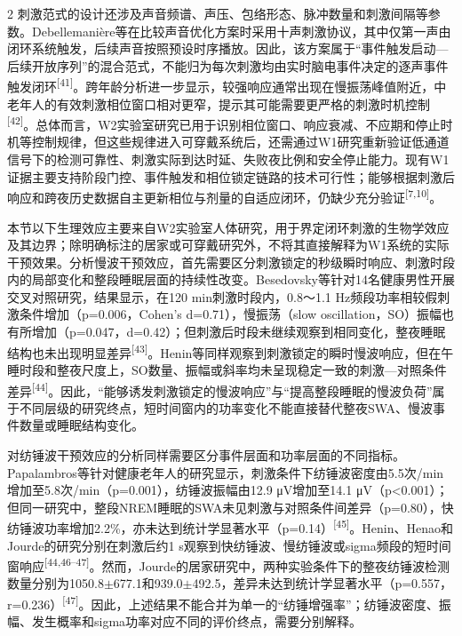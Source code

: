 \documentclass[UTF8,zihao=5,fontset=none]{ctexart}
\newcommand{\hei}{\CJKfamily{hei}}
\newcommand{\leveltwo}[1]{%
  \par\noindent{\hei\fontsize{10.5pt}{12.6pt}\selectfont\mdseries #1\par}}
\newcommand{\refcite}[1]{\nolinebreak[4]\textsuperscript{[#1]}}
\begin{document}
\begin{multicols}{2}
刺激范式的设计还涉及声音频谱、声压、包络形态、脉冲数量和刺激间隔等参数。Debellemanière等在比较声音优化方案时采用十声刺激协议，其中仅第一声由闭环系统触发，后续声音按照预设时序播放。因此，该方案属于“事件触发启动—后续开放序列”的混合范式，不能归为每次刺激均由实时脑电事件决定的逐声事件触发闭环\refcite{41}。跨年龄分析进一步显示，较强响应通常出现在慢振荡峰值附近，中老年人的有效刺激相位窗口相对更窄，提示其可能需要更严格的刺激时机控制\refcite{42}。总体而言，W2实验室研究已用于识别相位窗口、响应衰减、不应期和停止时机等控制规律，但这些规律进入可穿戴系统后，还需通过W1研究重新验证低通道信号下的检测可靠性、刺激实际到达时延、失败夜比例和安全停止能力。现有W1证据主要支持阶段门控、事件触发和相位锁定链路的技术可行性；能够根据刺激后响应和跨夜历史数据自主更新相位与剂量的自适应闭环，仍缺少充分验证\refcite{7,10}。\par

\leveltwo{3.2 慢波与纺锤活动调制及其耦合的生理证据}

本节以下生理效应主要来自W2实验室人体研究，用于界定闭环刺激的生物学效应及其边界；除明确标注的居家或可穿戴研究外，不将其直接解释为W1系统的实际干预效果。分析慢波干预效应，首先需要区分刺激锁定的秒级瞬时响应、刺激时段内的局部变化和整段睡眠层面的持续性改变。Besedovsky等针对14名健康男性开展交叉对照研究，结果显示，在120 min刺激时段内，0.8～1.1 Hz频段功率相较假刺激条件增加（p=0.006，Cohen's d=0.71），慢振荡（slow oscillation，SO）振幅也有所增加（p=0.047，d=0.42）；但刺激后时段未继续观察到相同变化，整夜睡眠结构也未出现明显差异\refcite{43}。Henin等同样观察到刺激锁定的瞬时慢波响应，但在午睡时段和整夜尺度上，SO数量、振幅或斜率均未呈现稳定一致的刺激—对照条件差异\refcite{44}。因此，“能够诱发刺激锁定的慢波响应”与“提高整段睡眠的慢波负荷”属于不同层级的研究终点，短时间窗内的功率变化不能直接替代整夜SWA、慢波事件数量或睡眠结构变化。\par

对纺锤波干预效应的分析同样需要区分事件层面和功率层面的不同指标。Papalambros等针对健康老年人的研究显示，刺激条件下纺锤波密度由5.5次/min增加至5.8次/min（p=0.001），纺锤波振幅由12.9 μV增加至14.1 μV（p<0.001）；但同一研究中，整段NREM睡眠的SWA未见刺激与对照条件间差异（p=0.80），快纺锤波功率增加2.2\%，亦未达到统计学显著水平（p=0.14）\refcite{45}。Henin、Henao和Jourde的研究分别在刺激后约1 s观察到快纺锤波、慢纺锤波或sigma频段的短时间窗响应\refcite{44,46--47}。然而，Jourde的居家研究中，两种实验条件下的整夜纺锤波检测数量分别为1050.8$\pm$677.1和939.0$\pm$492.5，差异未达到统计学显著水平（p=0.557，r=0.236）\refcite{47}。因此，上述结果不能合并为单一的“纺锤增强率”；纺锤波密度、振幅、发生概率和sigma功率对应不同的评价终点，需要分别解释。\par


\end{multicols}
\end{document}
